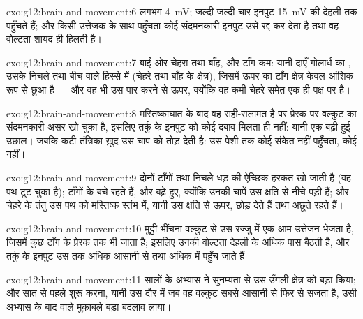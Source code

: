 \begin{solution}{exo:g12:brain-and-movement:6}
लगभग \qty{4}{mV}; जल्दी-जल्दी चार इनपुट \qty{15}{mV} की देहली तक पहुँचते
हैं; और किसी उत्तेजक के साथ पहुँचता कोई संदमनकारी इनपुट उसे रद्द कर देता है
तथा वह वोल्टता शायद ही हिलती है।
\end{solution}

\begin{solution}{exo:g12:brain-and-movement:7}
बाईं ओर चेहरा तथा बाँह, और टाँग कम: यानी दाएँ गोलार्ध का ,
उसके निचले तथा बीच वाले हिस्से में (चेहरे तथा बाँह के क्षेत्र), जिसमें ऊपर
का टाँग क्षेत्र केवल आंशिक रूप से छुआ है --- और वह भी उस पार करने से ऊपर,
क्योंकि वह कमी चेहरे समेत एक ही पक्ष पर है।
\end{solution}

\begin{solution}{exo:g12:brain-and-movement:8}
मस्तिष्काघात के बाद वह  सही-सलामत है पर प्रेरक  पर
वल्कुट का संदमनकारी असर खो चुका है, इसलिए तर्कु के इनपुट को कोई दबाव मिलता
ही नहीं: यानी एक बढ़ी हुई उछाल। जबकि कटी तंत्रिका ख़ुद उस चाप को तोड़ देती
है: उस पेशी तक कोई संकेत नहीं पहुँचता, कोई  नहीं।
\end{solution}

\begin{solution}{exo:g12:brain-and-movement:9}
दोनों टाँगों तथा निचले धड़ की ऐच्छिक हरकत खो जाती है (वह पथ टूट चुका है);
टाँगों के  बचे रहते हैं, और बढ़े हुए, क्योंकि उनकी चापें उस क्षति
से नीचे पड़ी हैं; और चेहरे के तंतु उस पथ को मस्तिष्क स्तंभ में, यानी उस
क्षति से ऊपर, छोड़ देते हैं तथा अछूते रहते हैं।
\end{solution}

\begin{solution}{exo:g12:brain-and-movement:10}
मुट्ठी भींचना वल्कुट से उस रज्जु में एक आम उत्तेजन भेजता है, जिसमें कुछ
टाँग के प्रेरक  तक भी जाता है; इसलिए उनकी वोल्टता देहली के अधिक पास
बैठती है, और तर्कु के इनपुट उस तक अधिक आसानी से तथा अधिक  में पहुँच
जाते हैं।
\end{solution}

\begin{solution}{exo:g12:brain-and-movement:11}
सालों के अभ्यास ने सुनम्यता से उस उँगली क्षेत्र को बड़ा किया; और सात से पहले
शुरू करना, यानी उस दौर में जब वह वल्कुट सबसे आसानी से फिर से सजता है, उसी
अभ्यास के बाद वाले मुक़ाबले बड़ा बदलाव लाया।
\end{solution}

